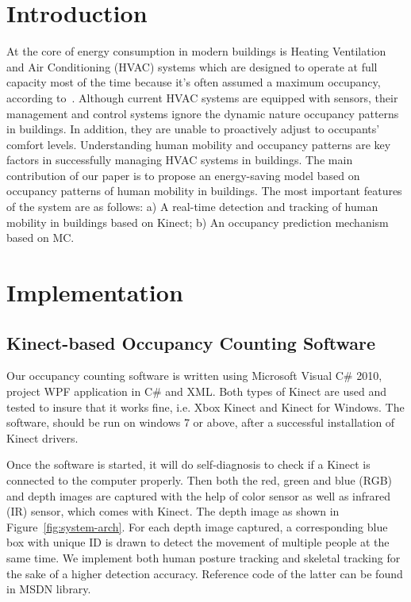 \documentclass{sig-alternate}
\begin{document}
\section{Introduction}
\label{sec:introduction}
At the core of energy consumption in
modern buildings is Heating Ventilation and Air Conditioning (HVAC)
systems which are designed to operate at full capacity most of the
time because it's often assumed a maximum occupancy, according
to~\cite{ref:Wang2011}. Although current HVAC systems are equipped with sensors, their management and control
systems ignore the dynamic nature occupancy patterns in buildings. In
addition, they are unable to proactively adjust to occupants' comfort
levels. Understanding human mobility and occupancy patterns are key
factors in successfully managing HVAC systems in buildings. The main
contribution of our paper is to propose an energy-saving model based
on occupancy patterns of human mobility in buildings. The most
important features of the system are as follows: a) A real-time
detection and tracking of human mobility in buildings based on
Kinect; b) An occupancy prediction mechanism based on MC. 
\par






\section{Implementation}
\label{sec:implementation}

\subsection{Kinect-based Occupancy Counting Software}
Our occupancy counting software is written using Microsoft Visual
C\# 2010, project WPF application in C\# and XML\@. Both types of
Kinect are used and tested to insure that it works fine, i.e. Xbox
Kinect and Kinect for Windows. The software, should be run on windows
7 or above, after a successful installation of Kinect drivers.    
\par

Once the software is started, it will do self-diagnosis to check
if a Kinect is connected to the computer properly. Then both the red,
green and blue (RGB) and depth images are captured with the help of
color sensor as well as infrared (IR) sensor, which comes with
Kinect. The depth image as shown in Figure~\ref{fig:system-arch}. For
each depth image captured, a corresponding blue box with unique ID is
drawn to detect the movement of multiple people at the same time. We
implement both human posture tracking and skeletal tracking for the
sake of a higher detection accuracy. Reference code of the latter can
be found in MSDN library.
\end{document}
